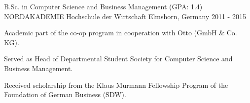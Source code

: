 \begin{cventries}
  \cventry
    {B.Sc. in Computer Science and Business Management (GPA: 1.4)} %
    {NORDAKADEMIE Hochschule der Wirtschaft} %
    {Elmshorn, Germany} %
    {2011 - 2015} %
    {
      \begin{cvitems} %
        \item{Academic part of the co-op program in cooperation with Otto (GmbH \& Co. KG).}
        \item{Served as Head of Departmental Student Society for Computer Science and Business Management.}
        \item{Received scholarship from the Klaus Murmann Fellowship Program of the Foundation of German Business (SDW).}
      \end{cvitems}
    }

\end{cventries}
